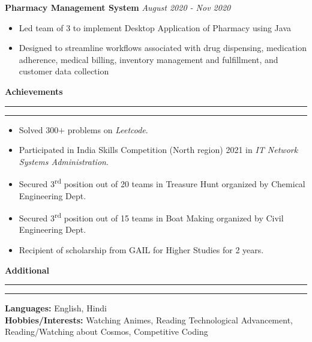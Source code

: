 \documentclass[11pt]{article}
\begin{document}
    	\hspace{8pt}\textbf{Pharmacy Management System}
    	\href{https://github.com/Abhay811/DBMS}{\color{blue}}
    	\hfill
    	\textit{August 2020 - Nov 2020}
    	\vspace{-6pt}
    	\begin{itemize}
        	\setlength{\itemsep}{0pt}
        	\setlength{\parskip}{0pt}
        	\setlength{\parsep}{0pt}
        	\item Led team of 3 to implement Desktop Application of Pharmacy using Java
        	\item Designed to streamline workflows associated with drug dispensing, medication adherence, medical billing, inventory management and fulfillment, and customer data collection
        \end{itemize}
    \textbf{\large{Achievements}}
    	\vspace{5pt}
    	\hrule \hrule
    	\vspace{-4pt}
   	    \begin{itemize}
        	\setlength{\itemsep}{0pt}
        	\setlength{\parskip}{0pt}
        	\setlength{\parsep}{0pt}
        	\item Solved 300$+$ problems on \textit{Leetcode}.
        	\item Participated in India Skills Competition (North region) 2021 in \textit{IT Network Systems Administration}.\href{https://drive.google.com/file/d/1nsGsz80LLaZx6pFgHgyKvapQtIfYAGc4/view?usp=sharing}{\color{blue}}
        	\item Secured 3\textsuperscript{rd} position out of 20 teams in Treasure Hunt organized by Chemical Engineering Dept.
        	\item Secured 3\textsuperscript{rd} position out of 15 teams in Boat Making organized by Civil Engineering Dept.
        	\item Recipient of scholarship from GAIL for Higher Studies for 2 years.
    	\end{itemize}
    
    \textbf{\large{Additional}}
    	\vspace{5pt}
    	\hrule \hrule
    	\vspace{4pt}
    	\textbf{Languages:} English, Hindi\\
    	\textbf{Hobbies/Interests:} Watching Animes, Reading Technological Advancement, Reading/Watching about Cosmos, Competitive Coding
    
\end{document}
